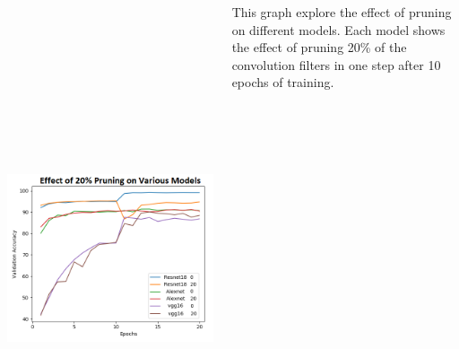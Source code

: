 \documentclass[25pt, a0paper,
               colspace=15mm, subcolspace=0mm,
               blockverticalspace=17mm,
               landscape]{tikzposter} %
\begin{document}
\begin{columns}
{\begin{center}
	\includegraphics[width=25cm, height=15cm]{figures/various_models}
\end{center}

This graph explore the effect of pruning on different models. Each model shows the effect of pruning 20\% of the convolution filters in one step after 10 epochs of training.
}
\end{columns}
\end{document}

